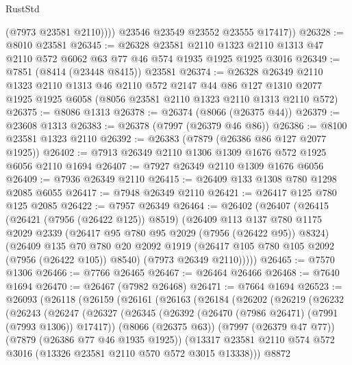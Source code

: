 \begin{lexlean}{RustStd}
\begin{coremodule}
{\begin{coremodule}
{{{{{{{{{{{{{{{{{{{{{{{{{{{{{{{{{{{{{{{{{{{              (@7973 @23581 @2110))))
        @23546
        @23549
        @23552
        @23555
        @17417))
@26328 := @8010 @23581
@26345 := @26328
    @23581
    @2110
    @1323
    @2110
    @1313
    @47
    @2110
    @572
    @6062
    @63
    @77
    @46
    @574
    @1935
    @1925
    @1925
    @3016
@26349 := @7851 (@8414 (@23448 @8415)) @23581
@26374 := @26328
    @26349
    @2110
    @1323
    @2110
    @1313
    @46
    @2110
    @572
    @2147
    @44
    @86
    @127
    @1310
    @2077
    @1925
    @1925
    @6058
    (@8056 @23581 @2110 @1323 @2110 @1313 @2110 @572)
@26375 := @8086 @1313
@26378 := @26374 (@8066 (@26375 @44))
@26379 := @23608 @1313
@26383 := @26378 (@7997 (@26379 @46 @86))
@26386 := @8100 @23581 @1323 @2110
@26392 := @26383 (@7879 (@26386 @86 @127 @2077 @1925))
@26402 := @7913 @26349 @2110 @1306 @1309 @1676 @572 @1925 @6056 @2110 @1694
@26407 := @7927 @26349 @2110 @1309 @1676 @6056
@26409 := @7936 @26349 @2110
@26415 := @26409 @133 @1308 @780 @1298 @2085 @6055
@26417 := @7948 @26349 @2110
@26421 := @26417 @125 @780 @125 @2085
@26422 := @7957 @26349
@26464 := @26402
    (@26407
      (@26415
        (@26421 (@7956 (@26422 @125)) @8519)
        (@26409
          @113
          @137
          @780
          @1175
          @2029
          @2339
          (@26417 @95 @780 @95 @2029 (@7956 (@26422 @95)) @8324)
          (@26409
            @135
            @70
            @780
            @20
            @2092
            @1919
            (@26417 @105 @780 @105 @2092 (@7956 (@26422 @105)) @8540)
            (@7973 @26349 @2110)))))
@26465 := @7570 @1306
@26466 := @7766 @26465
@26467 := @26464 @26466
@26468 := @7640 @1694
@26470 := @26467 (@7982 @26468)
@26471 := @7664 @1694
@26523 := @26093
    (@26118
      (@26159
        (@26161
          (@26163
            (@26184
              (@26202
                (@26219
                  (@26232
                    (@26243
                      (@26247
                        (@26327
                          (@26345
                            (@26392 (@26470 (@7986 @26471) (@7991 (@7993 @1306)) @17417))
                            (@8066 (@26375 @63))
                            (@7997 (@26379 @47 @77))
                            (@7879 (@26386 @77 @46 @1935 @1925))
                            (@13317
                              @23581
                              @2110
                              @574
                              @572
                              @3016
                              (@13326 @23581 @2110 @570 @572 @3015 @13338)))
                          @8872
}}}}}}}}}}}}}}}}}}}}}}}}}}}}}}}}}}}}}}}}}}}
\end{coremodule}}
\end{coremodule}
\end{lexlean}
